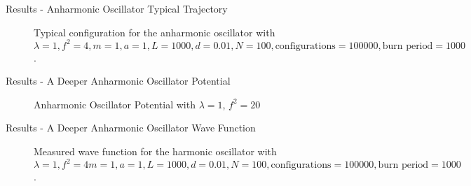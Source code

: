 \documentclass{beamer}
\begin{document}
\begin{frame}{Results - Anharmonic Oscillator Typical Trajectory}
    \begin{figure}
    \centering
        \caption{Typical configuration for the anharmonic oscillator with $\lambda = 1, f^2 = 4, m = 1, a = 1, L = 1000, d = 0.01, N = 100, \text{configurations} = 100000, \text{burn period} = 1000$.}
    \end{figure}
\end{frame}

\begin{frame}{Results - A Deeper Anharmonic Oscillator Potential}
    \begin{figure}
    \centering
        \caption{Anharmonic Oscillator Potential with $\lambda = 1$, $f^2 = 20$}
    \end{figure}
\end{frame}

\begin{frame}{Results - A Deeper Anharmonic Oscillator Wave Function}
    \begin{figure}
    \centering
        \caption{Measured wave function for the harmonic oscillator with $\lambda = 1, f^2=4 m = 1, a = 1, L = 1000, d = 0.01, N = 100, \text{configurations} = 100000, \text{burn period} = 1000$.}
    \end{figure}
\end{frame}
\end{document}
